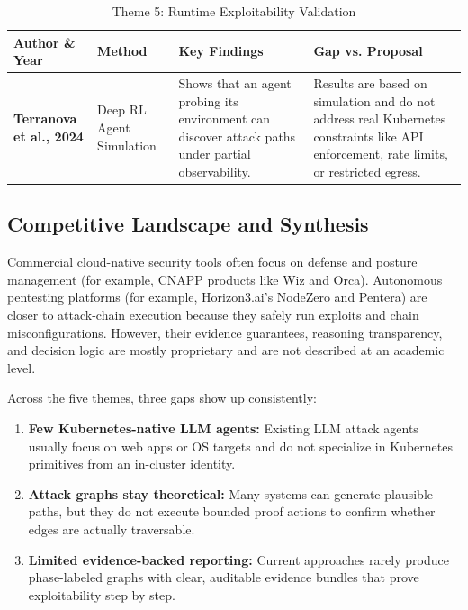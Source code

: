 \documentclass[conference]{IEEEtran}
\begin{document}
\begin{table}[t!]
\centering
\caption{Theme 5: Runtime Exploitability Validation}
\label{tab:litmatrix-theme5}
\scriptsize
\setlength{\tabcolsep}{5pt}
\renewcommand{\arraystretch}{1.3}
\begin{tabularx}{\textwidth}{l p{2.6cm} X X}
\toprule
\textbf{Author \& Year} & \textbf{Method} & \textbf{Key Findings} & \textbf{Gap vs. Proposal} \\
\midrule
\textbf{Terranova et al., 2024} \cite{garcia2024deep} & Deep RL Agent Simulation & Shows that an agent probing its environment can discover attack paths under partial observability. & Results are based on simulation and do not address real Kubernetes constraints like API enforcement, rate limits, or restricted egress. \\
\bottomrule
\end{tabularx}
\end{table}

\subsection{Competitive Landscape and Synthesis}
Commercial cloud-native security tools often focus on defense and posture management (for example, CNAPP products like Wiz and Orca). Autonomous pentesting platforms (for example, Horizon3.ai's NodeZero and Pentera) are closer to attack-chain execution because they safely run exploits and chain misconfigurations. However, their evidence guarantees, reasoning transparency, and decision logic are mostly proprietary and are not described at an academic level.

Across the five themes, three gaps show up consistently:
\begin{enumerate}
    \item \textbf{Few Kubernetes-native LLM agents:} Existing LLM attack agents usually focus on web apps or OS targets and do not specialize in Kubernetes primitives from an in-cluster identity.
    \item \textbf{Attack graphs stay theoretical:} Many systems can generate plausible paths, but they do not execute bounded proof actions to confirm whether edges are actually traversable.
    \item \textbf{Limited evidence-backed reporting:} Current approaches rarely produce phase-labeled graphs with clear, auditable evidence bundles that prove exploitability step by step.
\end{enumerate}
\end{document}
